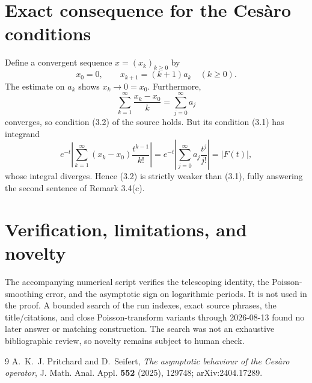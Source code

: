 \documentclass[11pt]{article}
\begin{document}
\section{Exact consequence for the Ces\`aro conditions}

Define a convergent sequence $x=(x_k)_{k\ge0}$ by
\[
 x_0=0,\qquad x_{k+1}=(k+1)a_k\quad(k\ge0).
\]
The estimate on $a_k$ shows $x_k\to0=x_0$.  Furthermore,
\[
 \sum_{k=1}^\infty\frac{x_k-x_0}{k}=\sum_{j=0}^\infty a_j
\]
converges, so condition (3.2) of the source holds.  But its condition (3.1)
has integrand
\[
 e^{-t}\left|\sum_{k=1}^\infty (x_k-x_0)\frac{t^{k-1}}{k!}\right|
 =e^{-t}\left|\sum_{j=0}^\infty a_j\frac{t^j}{j!}\right|=|F(t)|,
\]
whose integral diverges.  Hence (3.2) is strictly weaker than (3.1), fully
answering the second sentence of Remark 3.4(c).

\section{Verification, limitations, and novelty}

The accompanying numerical script verifies the telescoping identity, the
Poisson-smoothing error, and the asymptotic sign on logarithmic periods.  It is
not used in the proof.  A bounded search of the run indexes, exact source
phrases, the title/citations, and close Poisson-transform variants through
2026-08-13 found no later answer or matching construction.  The search was not
an exhaustive bibliographic review, so novelty remains subject to human check.

\begin{thebibliography}{9}
A.~K.~J. Pritchard and D.~Seifert,
\emph{The asymptotic behaviour of the Ces\`aro operator},
J. Math. Anal. Appl. \textbf{552} (2025), 129748;
arXiv:2404.17289.
\end{thebibliography}
\end{document}
